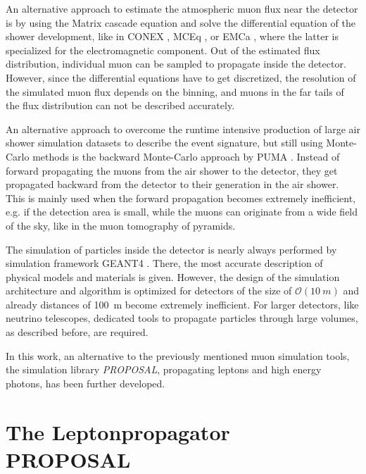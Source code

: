 An alternative approach to estimate the atmospheric muon flux near the detector is by using the Matrix cascade equation and solve the differential equation of the shower development, like in CONEX \cite{Bergmann07CONEX}, MCEq \cite{Fedynitch15MCEq}, or EMCa \cite{MeighenBerger19EMCa, MeighenBerger19ICRC}, where the latter is specialized for the electromagnetic component.
Out of the estimated flux distribution, individual muon can be sampled to propagate inside the detector.
However, since the differential equations have to get discretized, the resolution of the simulated muon flux depends on the binning, and muons in the far tails of the flux distribution can not be described accurately.

An alternative approach to overcome the runtime intensive production of large air shower simulation datasets to describe the event signature, but still using Monte-Carlo methods is the backward Monte-Carlo approach by PUMA \cite{Niess17}.
Instead of forward propagating the muons from the air shower to the detector, they get propagated backward from the detector to their generation in the air shower.
This is mainly used when the forward propagation becomes extremely inefficient, e.g. if the detection area is small, while the muons can originate from a wide field of the sky, like in the muon tomography of pyramids.

The simulation of particles inside the detector is nearly always performed by simulation framework GEANT4 \cite{Agostinelli03, Allison06, Allison16, GEANT4}.
There, the most accurate description of physical models and materials is given.
However, the design of the simulation architecture and algorithm is optimized for detectors of the size of $\mathcal{O}(\SI{10}{m})$ and already distances of \SI{100}{m} become extremely inefficient.
For larger detectors, like neutrino telescopes, dedicated tools to propagate particles through large volumes, as described before, are required.

In this work, an alternative to the previously mentioned muon simulation tools, the simulation library \textit{PROPOSAL}, propagating leptons and high energy photons, has been further developed.

%

\section{The Leptonpropagator PROPOSAL}

